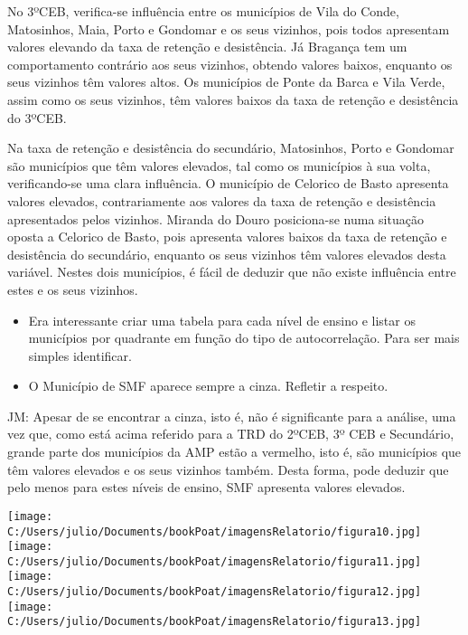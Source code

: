 \documentclass[
]{book}
\begin{document}
No 3ºCEB, verifica-se influência entre os municípios de Vila do Conde, Matosinhos, Maia, Porto e Gondomar e os seus vizinhos, pois todos apresentam valores elevando da taxa de retenção e desistência. Já Bragança tem um comportamento contrário aos seus vizinhos, obtendo valores baixos, enquanto os seus vizinhos têm valores altos. Os municípios de Ponte da Barca e Vila Verde, assim como os seus vizinhos, têm valores baixos da taxa de retenção e desistência do 3ºCEB.

Na taxa de retenção e desistência do secundário, Matosinhos, Porto e Gondomar são municípios que têm valores elevados, tal como os municípios à sua volta, verificando-se uma clara influência. O município de Celorico de Basto apresenta valores elevados, contrariamente aos valores da taxa de retenção e desistência apresentados pelos vizinhos. Miranda do Douro posiciona-se numa situação oposta a Celorico de Basto, pois apresenta valores baixos da taxa de retenção e desistência do secundário, enquanto os seus vizinhos têm valores elevados desta variável. Nestes dois municípios, é fácil de deduzir que não existe influência entre estes e os seus vizinhos.

\begin{itemize}
\item
  Era interessante criar uma tabela para cada nível de ensino e listar os municípios por quadrante em função do tipo de autocorrelação. Para ser mais simples identificar.
\item
  O Município de SMF aparece sempre a cinza. Refletir a respeito.
\end{itemize}

JM: Apesar de se encontrar a cinza, isto é, não é significante para a análise, uma vez que, como está acima referido para a TRD do 2ºCEB, 3º CEB e Secundário, grande parte dos municípios da AMP estão a vermelho, isto é, são municípios que têm valores elevados e os seus vizinhos também. Desta forma, pode deduzir que pelo menos para estes níveis de ensino, SMF apresenta valores elevados.

\texttt{[image: C:/Users/julio/Documents/bookPoat/imagensRelatorio/figura10.jpg]}\\
\texttt{[image: C:/Users/julio/Documents/bookPoat/imagensRelatorio/figura11.jpg]}\\
\texttt{[image: C:/Users/julio/Documents/bookPoat/imagensRelatorio/figura12.jpg]}\\
\texttt{[image: C:/Users/julio/Documents/bookPoat/imagensRelatorio/figura13.jpg]}
\end{document}

